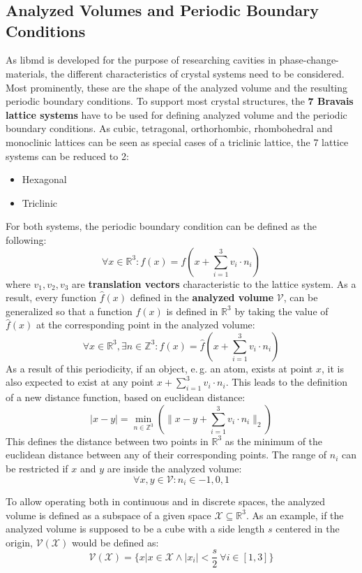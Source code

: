   \chapter{}
  \clearpage
  \section{Analyzed Volumes and Periodic Boundary Conditions}
  As libmd is developed for the purpose of researching cavities in phase-change-materials, the different characteristics of crystal systems need to be considered. Most prominently, these are the shape of the analyzed volume and the resulting periodic boundary conditions. To support most crystal structures, the \textbf{7 Bravais lattice systems} have to be used for defining analyzed volume and the periodic boundary conditions. As cubic, tetragonal, orthorhombic, rhombohedral and monoclinic lattices can be seen as special cases of a triclinic lattice, the 7 lattice systems can be reduced to 2:
  \begin{itemize}
  \item{Hexagonal}
  \item{Triclinic}
  \end{itemize}
  For both systems, the periodic boundary condition can be defined as the following:
  \[\forall x \in \mathbb{R}^3\colon f(x) = f(x+\sum_{i=1}^3 v_i \cdot n_i)\]
  where $v_1, v_2, v_3$ are \textbf{translation vectors} characteristic to the lattice system. As a result, every function $\hat{f}(x)$ defined in the \textbf{analyzed volume} $\mathcal{V}$, can be generalized so that a function $f(x)$ is defined in $\mathbb{R}^3$ by taking the value of $\hat{f}(x)$ at the corresponding point in the analyzed volume:
  \[\forall x \in \mathbb{R}^3, \exists n \in \mathbb{Z}^3\colon f(x) = \hat{f}(x+\sum_{i=1}^3 v_i \cdot n_i)\]
  As a result of this periodicity, if an object, e.\,g. an atom, exists at point $x$, it is also expected to exist at any point $x+\sum_{i=1}^3 v_i \cdot n_i$. This leads to the definition of a new distance function, based on euclidean distance:
  \[|x-y| = \min_{n \in \mathbb{Z}^3}(\|x-y+\sum_{i=1}^3 v_i \cdot n_i\|_2)\]
  This defines the distance between two points in $\mathbb{R}^3$ as the minimum of the euclidean distance between any of their corresponding points. The range of $n_i$ can be restricted if $x$ and $y$ are inside the analyzed volume:
  \[\forall x,y  \in \mathcal{V}\colon n_i\in {-1,0,1}\]
  
  To allow operating both in continuous and in discrete spaces, the analyzed volume is defined as a subspace of a given space $\mathcal{X} \subseteq \mathbb{R}^3$. As an example, if the analyzed volume is supposed to be a cube with a side length $s$ centered in the origin, $\mathcal{V}(\mathcal{X})$ would be defined as:
  \[\mathcal{V}(\mathcal{X}) = \{x | x \in \mathcal{X} \land |x_i| < \frac{s}{2} ~\forall i \in [1,3]\}\]
